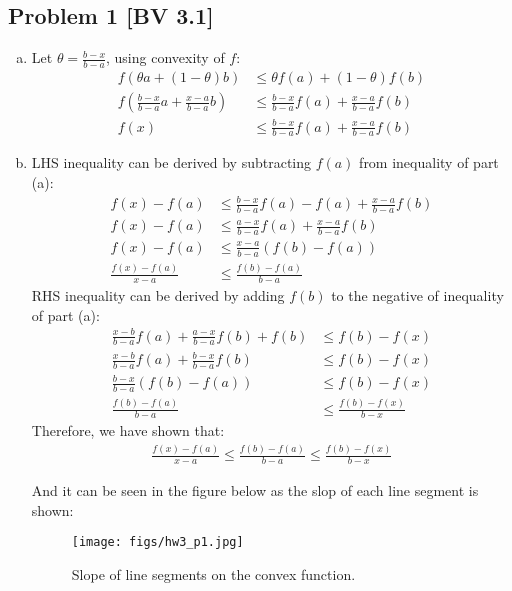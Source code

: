 \documentclass[12pt, letterpaper, twoside]{article}
\begin{document}
\subsection*{Problem 1 \small[BV 3.1]}
\begin{enumerate}[(a)]
    \item 
    Let $\theta=\frac{b-x}{b-a}$, using convexity of $f$:
    \begin{align*}
    f(\theta a + (1-\theta) b)&\leq\theta f(a)+(1-\theta)f(b)\\
    f(\frac{b-x}{b-a}a+\frac{x-a}{b-a}b)&\leq\frac{b-x}{b-a}f(a)+\frac{x-a}{b-a}f(b)\\
    f(x)&\leq\frac{b-x}{b-a}f(a)+\frac{x-a}{b-a}f(b)
    \end{align*}

    \item LHS inequality can be derived by subtracting $f(a)$ from inequality of part (a):
    \begin{align*}
        f(x)-f(a)&\leq\frac{b-x}{b-a}f(a)-f(a)+\frac{x-a}{b-a}f(b)\\
        f(x)-f(a)&\leq\frac{a-x}{b-a}f(a)+\frac{x-a}{b-a}f(b)\\
        f(x)-f(a)&\leq\frac{x-a}{b-a}(f(b)-f(a))\\
        \frac{f(x)-f(a)}{x-a}&\leq\frac{f(b)-f(a)}{b-a}
    \end{align*}
    RHS inequality can be derived by adding $f(b)$ to the negative of inequality of part (a):
    \begin{align*}
        \frac{x-b}{b-a}f(a)+\frac{a-x}{b-a}f(b)+f(b)&\leq f(b)-f(x)\\
        \frac{x-b}{b-a}f(a)+\frac{b-x}{b-a}f(b)&\leq f(b)-f(x)\\
        \frac{b-x}{b-a}(f(b)-f(a))&\leq f(b)-f(x)\\
        \frac{f(b)-f(a)}{b-a}&\leq \frac{f(b)-f(x)}{b-x}
    \end{align*}
    Therefore, we have shown that:
    \begin{align*}
        \frac{f(x)-f(a)}{x-a}\leq\frac{f(b)-f(a)}{b-a}\leq\frac{f(b)-f(x)}{b-x}
    \end{align*}
    
    And it can be seen in the figure below as the slop of each line segment is shown:
    
    \begin{figure}[h!]
        \centering
        \texttt{[image: figs/hw3\_p1.jpg]}
        \caption{Slope of line segments on the convex function.}
        \label{fig:slopes}
    \end{figure}
    

\end{enumerate}
\end{document}
